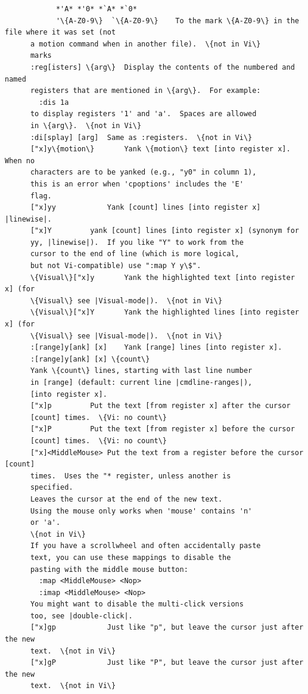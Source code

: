 \documentclass{beamer}
\begin{document}
\begin{frame}[fragile]
\begin{verbatim}
            *'A* *'0* *`A* *`0*
            '\{A-Z0-9\}  `\{A-Z0-9\}	To the mark \{A-Z0-9\} in the file where it was set (not
      a motion command when in another file).  \{not in Vi\}
      marks	
      :reg[isters] \{arg\}	Display the contents of the numbered and named
      registers that are mentioned in \{arg\}.  For example:
        :dis 1a
      to display registers '1' and 'a'.  Spaces are allowed
      in \{arg\}.  \{not in Vi\}
      :di[splay] [arg]	Same as :registers.  \{not in Vi\}
      ["x]y\{motion\}		Yank \{motion\} text [into register x].  When no
      characters are to be yanked (e.g., "y0" in column 1),
      this is an error when 'cpoptions' includes the 'E'
      flag.
      ["x]yy			Yank [count] lines [into register x] |linewise|.
      ["x]Y			yank [count] lines [into register x] (synonym for
      yy, |linewise|).  If you like "Y" to work from the
      cursor to the end of line (which is more logical,
      but not Vi-compatible) use ":map Y y\$".
      \{Visual\}["x]y		Yank the highlighted text [into register x] (for
      \{Visual\} see |Visual-mode|).  \{not in Vi\}
      \{Visual\}["x]Y		Yank the highlighted lines [into register x] (for
      \{Visual\} see |Visual-mode|).  \{not in Vi\}
      :[range]y[ank] [x]	Yank [range] lines [into register x].
      :[range]y[ank] [x] \{count\}
      Yank \{count\} lines, starting with last line number
      in [range] (default: current line |cmdline-ranges|),
      [into register x].
      ["x]p			Put the text [from register x] after the cursor
      [count] times.  \{Vi: no count\}
      ["x]P			Put the text [from register x] before the cursor
      [count] times.  \{Vi: no count\}
      ["x]<MiddleMouse>	Put the text from a register before the cursor [count]
      times.  Uses the "* register, unless another is
      specified.
      Leaves the cursor at the end of the new text.
      Using the mouse only works when 'mouse' contains 'n'
      or 'a'.
      \{not in Vi\}
      If you have a scrollwheel and often accidentally paste
      text, you can use these mappings to disable the
      pasting with the middle mouse button:
        :map <MiddleMouse> <Nop>
        :imap <MiddleMouse> <Nop>
      You might want to disable the multi-click versions
      too, see |double-click|.
      ["x]gp			Just like "p", but leave the cursor just after the new
      text.  \{not in Vi\}
      ["x]gP			Just like "P", but leave the cursor just after the new
      text.  \{not in Vi\}
  \end{verbatim}
\end{frame}
\end{document}
